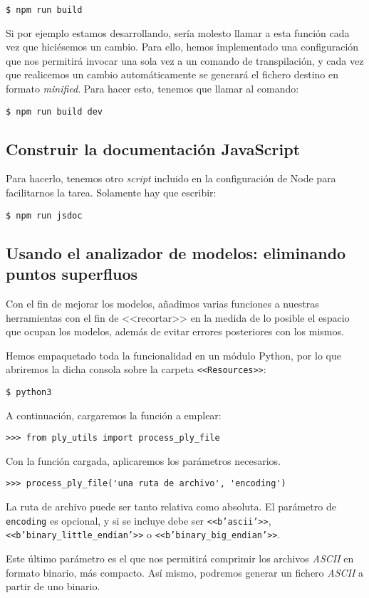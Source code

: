 \noindent\verb|$ npm run build|

Si por ejemplo estamos desarrollando, sería molesto llamar a esta función cada vez que hiciésemos un cambio. Para ello, hemos implementado una configuración que nos permitirá invocar una sola vez a un comando de transpilación, y cada vez que realicemos un cambio automáticamente se generará el fichero destino en formato \textit{minified}. Para hacer esto, tenemos que llamar al comando:

\noindent\verb|$ npm run build dev|

\subsection{Construir la documentación JavaScript}
Para hacerlo, tenemos otro \textit{script} incluido en la configuración de Node para facilitarnos la tarea. Solamente hay que escribir:

\noindent\verb|$ npm run jsdoc|

\subsection{Usando el analizador de modelos: eliminando puntos superfluos}
Con el fin de mejorar los modelos, añadimos varias funciones a nuestras herramientas con el fin de <<recortar>> en la medida de lo posible el espacio que ocupan los modelos, además de evitar errores posteriores con los mismos.

Hemos empaquetado toda la funcionalidad en un módulo Python, por lo que abriremos la dicha consola sobre la carpeta \texttt{<<Resources>>}:

\noindent\verb|$ python3|

A continuación, cargaremos la función a emplear:

\noindent\verb|>>> from ply_utils import process_ply_file|

Con la función cargada, aplicaremos los parámetros necesarios.

\noindent\verb|>>> process_ply_file('una ruta de archivo', 'encoding')|

La ruta de archivo puede ser tanto relativa como absoluta.
El parámetro de \texttt{encoding} es opcional, y si se incluye debe ser \texttt{<<b'ascii'>>}, \texttt{<<b'binary\_little\_endian'>>} o \texttt{<<b{'binary\_big\_endian'}>>}.

Este último parámetro es el que nos permitirá comprimir los archivos \textit{ASCII} en formato binario, más compacto. Así mismo, podremos generar un fichero \textit{ASCII} a partir de uno binario.

